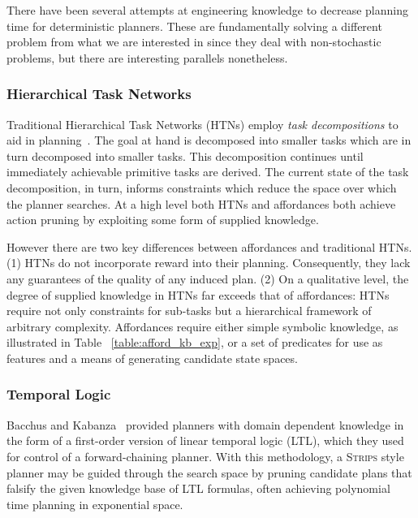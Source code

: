 \documentclass[letterpaper]{article}
\begin{document}
There have been several attempts at engineering knowledge
to decrease planning time for deterministic planners. These are
fundamentally solving a different problem from what we are interested
in since they deal with non-stochastic problems, but there are
interesting parallels nonetheless.

\subsubsection{Hierarchical Task Networks}
Traditional Hierarchical Task Networks (HTNs) employ \textit{task decompositions} to aid in planning~\cite{erol1994htn}. The goal at hand is decomposed into smaller tasks which are in turn decomposed into smaller tasks. This decomposition continues until immediately achievable primitive tasks are derived. The current state of the task decomposition, in turn, informs constraints which reduce the space over which the planner searches. At a high level both HTNs and affordances both achieve action pruning by exploiting some form of supplied knowledge. 

However there are two key differences between affordances and traditional HTNs.  (1) HTNs do not incorporate reward into their planning. Consequently, they lack any guarantees of the quality of any induced plan. (2) On a qualitative level, the degree of supplied knowledge in HTNs far exceeds that of affordances: HTNs require not only constraints for sub-tasks but a hierarchical framework of arbitrary complexity. Affordances require either simple symbolic knowledge, as illustrated in Table ~\ref{table:afford_kb_exp}, or a set of predicates for use as features and a means of generating candidate state spaces.

\subsubsection{Temporal Logic}
Bacchus and Kabanza~\cite{Bacchus95usingtemporal,Bacchus99usingtemporal} provided
planners with domain dependent knowledge in the form of a first-order version of linear
temporal logic (LTL), which they used for control of a forward-chaining planner. With this methodology, 
a \textsc{Strips} style planner may be guided through the search space by pruning
candidate plans that falsify the given knowledge base of LTL formulas, often
achieving polynomial time planning in exponential space.
\end{document}
